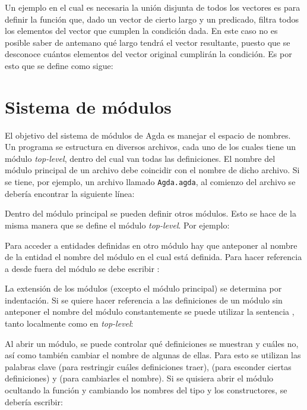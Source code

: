Un ejemplo en el cual es necesaria la unión disjunta de todos los vectores es para definir la función  que, dado un vector de cierto largo  y un predicado, filtra todos los elementos del vector que cumplen la condición dada. En este caso no es posible saber de antemano qué largo tendrá el vector resultante, puesto que se desconoce cuántos elementos del vector original cumplirán la condición. Es por esto que se define como sigue:


\section{Sistema de módulos}\label{agda:modules}

El objetivo del sistema de módulos de Agda es manejar el espacio de nombres. Un programa se estructura en diversos archivos, cada uno de los cuales tiene un módulo \textit{top-level}, dentro del cual van todas las definiciones. El nombre del módulo principal de un archivo debe coincidir con el nombre de dicho archivo. Si se tiene, por ejemplo, un archivo llamado \texttt{Agda.agda}, al comienzo del archivo se debería encontrar la siguiente línea:


Dentro del módulo principal se pueden definir otros módulos. Esto se hace de la misma manera que se define el módulo \textit{top-level}. Por ejemplo:


Para acceder a entidades definidas en otro módulo hay que anteponer al nombre de la entidad el nombre del módulo en el cual está definida. Para hacer referencia a  desde fuera del módulo  se debe escribir :




La extensión de los módulos (excepto el módulo principal) se determina por indentación. Si se quiere hacer referencia a las definiciones de un módulo sin anteponer el nombre del módulo constantemente se puede utilizar la sentencia , tanto localmente como en \textit{top-level}:






Al abrir un módulo, se puede controlar qué definiciones se muestran y cuáles no, así como también cambiar el nombre de algunas de ellas. Para esto se utilizan las palabras clave  (para restringir cuáles definiciones traer),  (para esconder ciertas definiciones) y  (para cambiarles el nombre). Si se quisiera abrir el módulo  ocultando la función  y cambiando los nombres del tipo y los constructores, se debería escribir:


